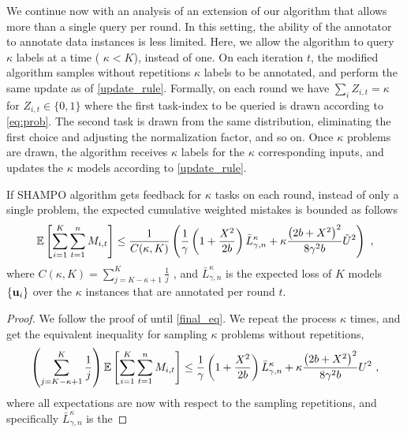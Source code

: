 {We continue now with an analysis of an extension of our
algorithm that allows more than a single query per round. In this setting, the ability  
of the annotator to annotate data instances is less limited. Here, we
allow the algorithm to query $\kappa$ labels at a time ( $\kappa<K$), instead of one. On each
iteration $t$, the modified algorithm samples without repetitions
$\kappa$ labels to be annotated, and perform the same update as of
\eqref{update_rule}. Formally, on each round we have $\sum_i
Z_{i,t}=\kappa$ for $Z_{i,t}\in\{0,1\}$ where the first task-index to
be queried is
drawn according to \eqref{eq:prob}. The second task is drawn from the
same distribution, eliminating the first choice and adjusting the normalization factor, and so on. Once
$\kappa$ problems are drawn, the algorithm receives $\kappa$ labels for
the $\kappa$ corresponding inputs, and updates the $\kappa$ models
according to \eqref{update_rule}.
\begin{corollary}
  If SHAMPO algorithm gets feedback for $\kappa$ tasks on each round,
  instead of only a single problem, the expected cumulative weighted
  mistakes is bounded as follows
\begin{displaymath}
\mathbb{E}\left[ \sum_{i=1}^{K}\sum_{t=1}^{n}{M_{i,t}} \right] 
\le \frac{1}{C(\kappa,K)}\left({\frac{1}{\gamma}\left(1+\frac{X^2}{2b} \right){\bar L}^\kappa_{\gamma,n}
+\kappa\frac{\left({2b+X^2}\right)^2}{8{\gamma}^2b}\tilde{U}^2}\right)~,
\end{displaymath}
where $C(\kappa,K) = \sum_{j=K-\kappa+1}^{K}\frac{1}{j}$ , and
${\bar L}^\kappa_{\gamma,n}$ is the expected loss of $K$ models
$\{\mathbf{u}_{i}\}$ over the $\kappa$ instances that are annotated per round
$t$.
\end{corollary}
\begin{proof}
  We follow the proof of  until \eqref{final_eq}. We
  repeat the process $\kappa$ times, and get the equivalent inequality
  for sampling $\kappa$ problems without repetitions,
\begin{equation}
\begin{split}
  \left({\sum_{j=K-\kappa+1}^{K}\frac{1}{j}}\right)\mathbb{E}\left[ \sum_{i=1}^{K}\sum_{t=1}^{n}{M_{i,t}} \right]
\le \frac{1}{\gamma}\left(1+\frac{X^2}{2b} \right){\bar L}^\kappa_{\gamma,n}
+\kappa\frac{\left({2b+X^2}\right)^2}{8{\gamma}^2b} U^2~,
\end{split}
\label{final_eq_k}
\end{equation}
where all expectations are now with respect to the sampling
repetitions, and specifically ${\bar L}^\kappa_{\gamma,n}$ is the

\end{proof}}
